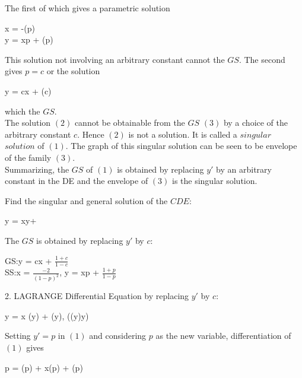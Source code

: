 \documentclass[11pt]{amsbook}
\begin{document}
The first of which gives a parametric solution
\begin{center}
x = -\operatorname*{\psi\prime}(p)\\
y = xp + \operatorname*{\psi}(p)\\
\end{center}
This solution not involving an arbitrary constant cannot the $GS$. The second gives $p = c$ or the solution
\begin{center}
y = cx + \operatorname*{\psi}(c)\\
\end{center}
which the $GS$.\\
The solution $(2)$ cannot be obtainable from the $GS$ $(3)$ by a choice of the arbitrary constant $c$. Hence $(2)$ is not a solution. It is called a $singular$ $solution$ of $(1)$. The graph of this singular solution can be seen to be envelope of the family $(3)$.\\
Summarizing, the $GS$ of $(1)$ is obtained by replacing $y\prime$ by an arbitrary constant in the DE and the envelope of $(3)$ is the singular solution.\\
\begin{exmp}
Find the singular and general solution of the $CDE$:
\end{exmp}
\begin{center}
y = xy\prime + \\
\end{center}
\begin{hSolution}
The $GS$ is obtained by replacing $y\prime$ by $c$:
\begin{center}GS:\quad y = cx + $\frac{1 + c}{1 - c}$\\SS:\quad x = $\frac{-2}{(1 - p)^2}$, y = xp + $\frac{1+p}{1-p}$\\
\end{center}
2. LAGRANGE Differential Equation by replacing $y\prime$ by $c$:
\begin{center}
y = x \phi(y\prime) + \psi(y\prime), \quad (\phi(y\prime)\not\equiv y\prime)\\
\end{center}
Setting $y\prime = p$ in $(1)$ and considering $p$ as the new variable, differentiation of $(1)$ gives
\begin{center}
p = \phi(p) + x\phi\prime(p) + \psi\prime(p)\\
\end{center}
\end{hSolution}
\end{document}
